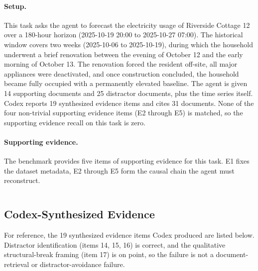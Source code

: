 \documentclass[]{servicenow}
\begin{document}
\paragraph{Setup.}
This task asks the agent to forecast the electricity usage of Riverside Cottage 12 over a 180-hour horizon (2025-10-19 20:00 to 2025-10-27 07:00). The historical window covers two weeks (2025-10-06 to 2025-10-19), during which the household underwent a brief renovation between the evening of October 12 and the early morning of October 13. The renovation forced the resident off-site, all major appliances were deactivated, and once construction concluded, the household became fully occupied with a permanently elevated baseline. The agent is given 14 supporting documents and 25 distractor documents, plus the time series itself. Codex reports 19 synthesized evidence items and cites 31 documents. None of the four non-trivial supporting evidence items (E2 through E5) is matched, so the supporting evidence recall on this task is zero.


\paragraph{Supporting evidence.}
The benchmark provides five items of supporting evidence for this task. E1 fixes the dataset metadata, E2 through E5 form the causal chain the agent must reconstruct.

\begin{tcolorbox}[title=Supporting evidence (Task 216), breakable]
\inputminted[fontsize=\scriptsize, breaklines, breaksymbolleft={}, breaksymbolright={}]{markdown}{DR_failure/216_se.txt}
\end{tcolorbox}

\subsection{Codex-Synthesized Evidence}
\label{appx:task216:synth}

For reference, the 19 synthesized evidence items Codex produced are listed below. Distractor identification (items 14, 15, 16) is correct, and the qualitative structural-break framing (item 17) is on point, so the failure is not a document-retrieval or distractor-avoidance failure.

\begin{tcolorbox}[title=Codex-synthesized evidence (Task 216), breakable]
\inputminted[fontsize=\scriptsize, breaklines, breaksymbolleft={}, breaksymbolright={}]{markdown}{DR_failure/216_codex.txt}
\end{tcolorbox}
\end{document}
